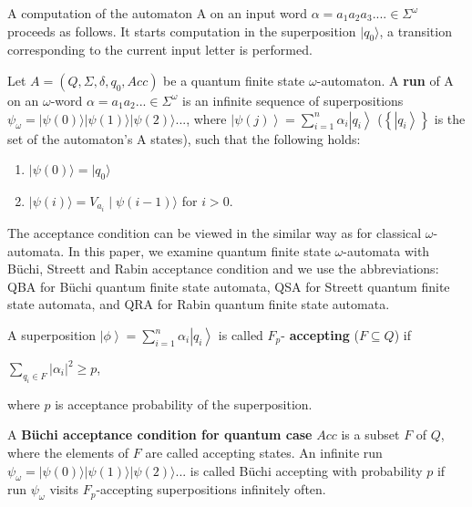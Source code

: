 \documentclass{llncs}
\begin{document}
A computation of the automaton A on an input word $\alpha=a_1a_2a_3.... \in \Sigma^{\omega}$ proceeds as follows. It starts computation in the superposition $\mid q_{0} \rangle$, a transition corresponding to the current input letter is performed. 
%
\begin{definition}
Let $A = (Q, \Sigma, \delta, q_0, Acc)$ be a quantum finite state $\omega$-automaton. A \textbf{run} of A on an $\omega$-word $\alpha = a_1 a_2 ... \in \Sigma^{\omega}$ is an infinite sequence of superpositions $\psi_\omega = |\psi(0)\rangle|\psi(1)\rangle|\psi(2)\rangle...$, where $\left|\psi(j)\right\rangle=\sum^{n}_{i=1}\alpha_{i} \left|q_{i}\right\rangle$ ($\left\{\left| q_{i}\right\rangle\right\}$ is the set of the automaton's A states), such that the following holds:
\begin{enumerate}
\item $\mid \psi(0) \rangle = \mid q_{0} \rangle$
\item $\mid \psi(i) \rangle = V_{a_i} \mid \psi(i-1) \rangle$ for $i > 0$.
\end{enumerate}
\end{definition}
%

The acceptance condition can be viewed in the similar way as for classical $\omega$-automata. In this paper, we examine quantum finite state $\omega$-automata with B\"uchi, Streett and Rabin acceptance condition and we use the abbreviations: QBA for B\"uchi quantum finite state automata, QSA for Streett quantum finite state automata, and QRA for Rabin quantum finite state automata.

\begin{definition}
A superposition $\left|\phi\right\rangle=\sum^{n}_{i=1}\alpha_{i} \left|q_{i}\right\rangle$ is called $F_p$- \textbf{accepting} ($F \subseteq Q$) if 
\begin{center}
$\sum_{q_i \in F}\vert\alpha_{i}\vert^2 \geq p$,
\end{center}
where $p$ is acceptance probability of the superposition.
\end{definition}

\begin{definition}
A \textbf{B\"uchi acceptance condition for quantum case} $Acc$ is a subset $F$ of $Q$, where the elements of $F$ are called accepting states. An infinite run $\psi_\omega = |\psi(0)\rangle|\psi(1)\rangle|\psi(2)\rangle...$ is called B\"uchi accepting with probability $p$ if run $\psi_\omega$ visits $F_p$-accepting superpositions infinitely often.
\end{definition}
\end{document}
